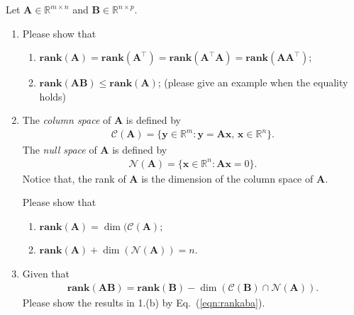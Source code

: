 \documentclass[11pt,letter,notitlepage]{article}
\renewcommand{\eqref}[1]{Eq.~(\ref{#1})}
\newcommand{\rank}[1]{ \textbf{rank}  (#1)  }
\theoremstyle{definition}
\begin{document}
	
	\newpage
	\begin{exercise}
		Let $\mathbf{A} \in \mathbb{R}^{m\times n}$ and $\mathbf{B}\in \mathbb{R}^{n\times p}$.
		\begin{enumerate}
			\item Please show that
			\begin{enumerate}
				\item $\rank{\mathbf{A}} = \rank{\mathbf{A}^{\top}} = \rank{\mathbf{A}^{\top}\mathbf{A}}= \rank{\mathbf{A}\mathbf{A}^{\top}}$;
				\item $\rank{\mathbf{A}\mathbf{B}} \leq \rank{\mathbf{A}}$; (please give an example when the equality holds)
			\end{enumerate}
			\item The \emph{column space} of $\mathbf{A}$ is defined by
			\begin{align*}
				\mathcal{C}(\mathbf{A} ) = \{ \mathbf{y}\in \mathbb{R}^m : \mathbf{y} = \mathbf{Ax},\,\mathbf{x}\in\mathbb{R}^n\}.
			\end{align*}
			The \emph{null space} of $\mathbf{A}$ is defined by
			\begin{align*}
				\mathcal{N}(\mathbf{A})  = \{ \mathbf{x}\in \mathbb{R}^n : \mathbf{Ax}=0\}.
			\end{align*}
			Notice that, the rank of $\mathbf{A}$ is the dimension of the column space of $\mathbf{A}$.
			
			Please show that
			\begin{enumerate}
				\item $\rank{\mathbf{A}} = \dim(\mathcal{C}(\mathbf{A})$;
				\item $\rank{\mathbf{A}} + \dim ( \mathcal{N}( \mathbf{A} ) ) = n$.
			\end{enumerate}
			\item Given that
			\begin{align}\label{eqn:rankaba}
				\rank{\mathbf{AB}}=\rank{\mathbf{B}}-\dim(\mathcal{C}(\mathbf{B})\cap \mathcal{N}(\mathbf{A})).
			\end{align}
			Please show the results in 1.(b) by \eqref{eqn:rankaba}.
		\end{enumerate}
	\end{exercise}


	
	
\end{document}
